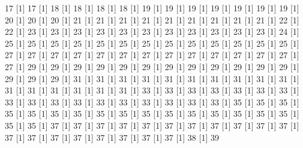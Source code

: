 \documentclass[12pt]{article}
\begin{document}
\begin{Schunk}
\begin{Soutput}
[1] 17%
[1] 17%
[1] 18%
[1] 18%
[1] 18%
[1] 18%
[1] 19%
[1] 19%
[1] 19%
[1] 19%
[1] 19%
[1] 19%
[1] 19%
[1] 20%
[1] 20%
[1] 20%
[1] 21%
[1] 21%
[1] 21%
[1] 21%
[1] 21%
[1] 21%
[1] 21%
[1] 21%
[1] 21%
[1] 22%
[1] 22%
[1] 23%
[1] 23%
[1] 23%
[1] 23%
[1] 23%
[1] 23%
[1] 23%
[1] 23%
[1] 23%
[1] 23%
[1] 23%
[1] 24%
[1] 25%
[1] 25%
[1] 25%
[1] 25%
[1] 25%
[1] 25%
[1] 25%
[1] 25%
[1] 25%
[1] 25%
[1] 25%
[1] 25%
[1] 25%
[1] 27%
[1] 27%
[1] 27%
[1] 27%
[1] 27%
[1] 27%
[1] 27%
[1] 27%
[1] 27%
[1] 27%
[1] 27%
[1] 27%
[1] 27%
[1] 27%
[1] 29%
[1] 29%
[1] 29%
[1] 29%
[1] 29%
[1] 29%
[1] 29%
[1] 29%
[1] 29%
[1] 29%
[1] 29%
[1] 29%
[1] 29%
[1] 29%
[1] 29%
[1] 31%
[1] 31%
[1] 31%
[1] 31%
[1] 31%
[1] 31%
[1] 31%
[1] 31%
[1] 31%
[1] 31%
[1] 31%
[1] 31%
[1] 31%
[1] 31%
[1] 31%
[1] 31%
[1] 33%
[1] 33%
[1] 33%
[1] 33%
[1] 33%
[1] 33%
[1] 33%
[1] 33%
[1] 33%
[1] 33%
[1] 33%
[1] 33%
[1] 33%
[1] 33%
[1] 33%
[1] 33%
[1] 33%
[1] 35%
[1] 35%
[1] 35%
[1] 35%
[1] 35%
[1] 35%
[1] 35%
[1] 35%
[1] 35%
[1] 35%
[1] 35%
[1] 35%
[1] 35%
[1] 35%
[1] 35%
[1] 35%
[1] 35%
[1] 35%
[1] 37%
[1] 37%
[1] 37%
[1] 37%
[1] 37%
[1] 37%
[1] 37%
[1] 37%
[1] 37%
[1] 37%
[1] 37%
[1] 37%
[1] 37%
[1] 37%
[1] 37%
[1] 37%
[1] 37%
[1] 37%
[1] 37%
[1] 38%
[1] 39%

\end{Soutput}
\end{Schunk}
\end{document}

